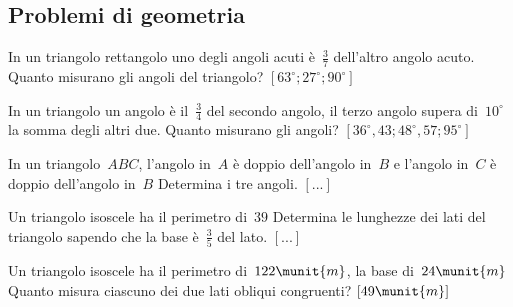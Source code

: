 
\subsection{Problemi di geometria}

\begin{htmulticols}{2}
\begin{esercizio}[*]
\label{ese:14.82}
In un triangolo rettangolo uno degli angoli acuti è~\(\frac{3}{7}\) dell'altro 
angolo acuto. Quanto misurano gli angoli del triangolo?
 \hfill \(\left[63^{\circ}; 27^{\circ}; 90^{\circ}\right]\)
\end{esercizio}

\begin{esercizio}[*]
\label{ese:14.83}
In un triangolo un angolo è il~\(\frac{3}{4}\) del secondo angolo, il terzo 
angolo 
supera di~\(10^{\circ}\) la somma degli altri due. Quanto misurano gli angoli?
 \hfill \(\left[36^{\circ},43; 48^{\circ},57; 95^{\circ}\right]\)
\end{esercizio}

\begin{esercizio}
\label{ese:14.84}
In un triangolo~\(ABC\), l'angolo in~\(A\) è doppio dell'angolo in~\(B\) e 
l'angolo 
in~\(C\) è doppio dell'angolo in~\(B\) Determina i tre angoli.
 \hfill \(\left[...\right]\)
\end{esercizio}

\begin{esercizio}
\label{ese:14.85}
Un triangolo isoscele ha il perimetro di~\(39\) Determina le lunghezze dei lati 
del triangolo sapendo che la base è~\(\frac{3}{5}\) del lato.
 \hfill \(\left[...\right]\)
\end{esercizio}

\begin{esercizio}[*]
\label{ese:14.86}
Un triangolo isoscele ha il perimetro di~\(122\munit{m}\), la base 
di~\(24\munit{m}\) 
Quanto misura ciascuno dei due lati obliqui congruenti?
 \hfill \(\left[49\munit{m}\right]\)
\end{esercizio}

% 


\end{htmulticols}
